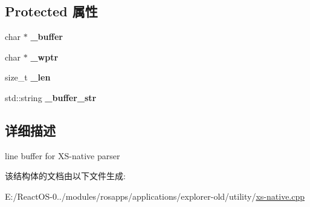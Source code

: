 \subsection*{Protected 属性}
\begin{DoxyCompactItemize}
\item 
\mbox{\label{struct_x_m_l_storage_1_1_buffer_a342e9319da0b98fac9223767c4ed81bf}} 
char $\ast$ {\bfseries \+\_\+buffer}
\item 
\mbox{\label{struct_x_m_l_storage_1_1_buffer_a0ffd16e3abd282f5e1dab389f2f7a331}} 
char $\ast$ {\bfseries \+\_\+wptr}
\item 
\mbox{\label{struct_x_m_l_storage_1_1_buffer_adb15491a8dce5097aba4a0c5caf967b9}} 
size\+\_\+t {\bfseries \+\_\+len}
\item 
\mbox{\label{struct_x_m_l_storage_1_1_buffer_aae70b78b92eb81767066090e0d6107ab}} 
std\+::string {\bfseries \+\_\+buffer\+\_\+str}
\end{DoxyCompactItemize}


\subsection{详细描述}
line buffer for X\+S-\/native parser 

该结构体的文档由以下文件生成\+:\begin{DoxyCompactItemize}
\item 
E\+:/\+React\+O\+S-\/0../modules/rosapps/applications/explorer-\/old/utility/\hyperlink{xs-native_8cpp}{xs-\/native.\+cpp}\end{DoxyCompactItemize}
